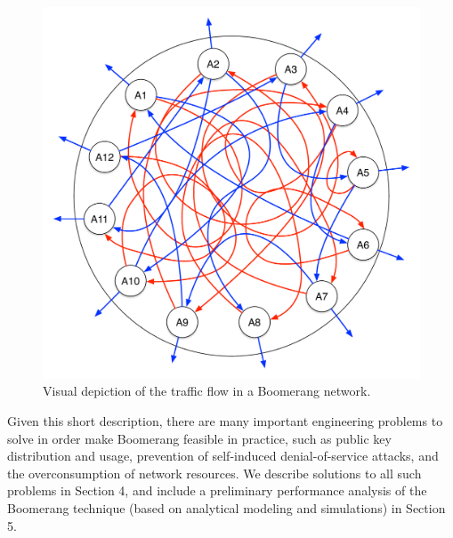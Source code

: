 \begin{figure}[ht!]
\begin{center}
\includegraphics[scale=0.25]{./images/boomerang_net.pdf}
\caption{Visual depiction of the traffic flow in a Boomerang network.}
\label{fig:boomerang_net}
\end{center}
\end{figure}

Given this short description, there are many important engineering problems to solve in order make Boomerang feasible in practice, such as public key distribution and usage, prevention of self-induced denial-of-service attacks, and the overconsumption of network resources. We describe solutions to all such problems in Section 4, and include a preliminary performance analysis of the Boomerang technique (based on analytical modeling and simulations) in Section 5. 
